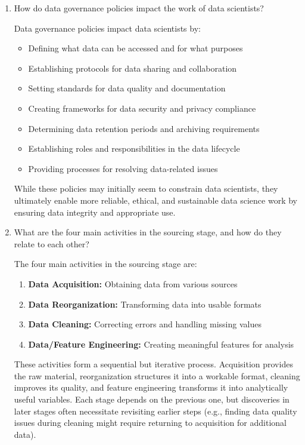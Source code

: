 \documentclass[12pt]{article}
\begin{document}
\begin{enumerate}
    \item How do data governance policies impact the work of data scientists?
    
    \begin{tcolorbox}[colback=blue!5!white,colframe=blue!75!black,title=Solution]
    Data governance policies impact data scientists by:
    \begin{itemize}
        \item Defining what data can be accessed and for what purposes
        \item Establishing protocols for data sharing and collaboration
        \item Setting standards for data quality and documentation
        \item Creating frameworks for data security and privacy compliance
        \item Determining data retention periods and archiving requirements
        \item Establishing roles and responsibilities in the data lifecycle
        \item Providing processes for resolving data-related issues
    \end{itemize}
    While these policies may initially seem to constrain data scientists, they ultimately enable more reliable, ethical, and sustainable data science work by ensuring data integrity and appropriate use.
    \end{tcolorbox}
    
    \item What are the four main activities in the sourcing stage, and how do they relate to each other?
    
    \begin{tcolorbox}[colback=blue!5!white,colframe=blue!75!black,title=Solution]
    The four main activities in the sourcing stage are:
    \begin{enumerate}
        \item \textbf{Data Acquisition:} Obtaining data from various sources
        \item \textbf{Data Reorganization:} Transforming data into usable formats
        \item \textbf{Data Cleaning:} Correcting errors and handling missing values
        \item \textbf{Data/Feature Engineering:} Creating meaningful features for analysis
    \end{enumerate}
    
    These activities form a sequential but iterative process. Acquisition provides the raw material, reorganization structures it into a workable format, cleaning improves its quality, and feature engineering transforms it into analytically useful variables. Each stage depends on the previous one, but discoveries in later stages often necessitate revisiting earlier steps (e.g., finding data quality issues during cleaning might require returning to acquisition for additional data).
    \end{tcolorbox}
    

\end{enumerate}
\end{document}
